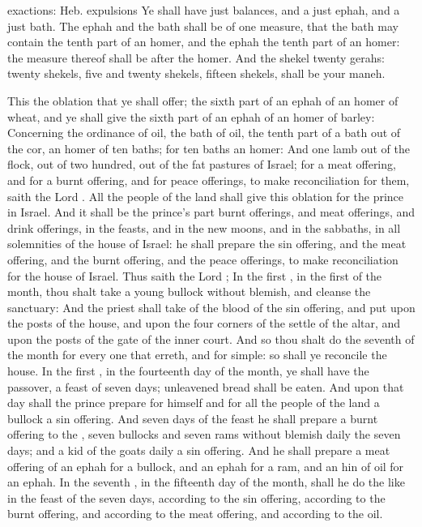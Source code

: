 {{exactions: Heb. expulsions}
Ye shall have
just
balances, and a
just
ephah, and a
just
bath.
The
ephah and the
bath shall be of
one
measure, that the
bath may
contain the tenth
part of an
homer, and the
ephah the tenth
part of an
homer: the
measure thereof shall be after the
homer.
And the
shekel
{}
twenty
gerahs:
twenty
shekels,
five and
twenty
shekels,
fifteen
shekels, shall be your
maneh.
\par }{\PP {}This
{} the
oblation that ye shall
offer; the sixth
part of an
ephah of an
homer of
wheat, and ye shall give the sixth
part of an
ephah of an
homer of
barley:
Concerning the
ordinance of
oil, the
bath of
oil,
{} the tenth
part of a
bath out of the
cor,
{} an
homer of
ten
baths; for
ten
baths
{} an
homer:
And
one
lamb out of the
flock, out of two
hundred, out of the fat
pastures of
Israel; for a meat
offering, and for a burnt
offering, and for peace
offerings, to make
reconciliation for them,
saith the
Lord
{}.
All the
people of the
land shall give this
oblation for the
prince in
Israel.
And it shall be the
prince’s part
{} burnt
offerings, and meat
offerings, and drink
offerings, in the
feasts, and in the new
moons, and in the
sabbaths, in all
solemnities of the
house of
Israel: he shall
prepare the sin
offering, and the meat
offering, and the burnt
offering, and the peace
offerings, to make
reconciliation for the
house of
Israel.
Thus
saith the
Lord
{}; In the
first
{}, in the
first
{} of the
month, thou shalt
take a
young
bullock without
blemish, and
cleanse the
sanctuary:
And the
priest shall
take of the
blood of the sin
offering, and
put
{} upon the
posts of the
house, and upon the
four
corners of the
settle of the
altar, and upon the
posts of the
gate of the
inner
court.
And so thou shalt
do the
seventh
{} of the
month for every
one that
erreth, and for
{}
simple: so shall ye
reconcile the
house.
In the
first
{}, in the
fourteenth
day of the
month, ye shall have the
passover, a
feast of
seven
days; unleavened
bread shall be
eaten.
And upon that
day shall the
prince
prepare for himself and for all the
people of the
land a
bullock
{} a sin
offering.
And
seven
days of the
feast he shall
prepare a burnt
offering to the
{},
seven
bullocks and
seven
rams without
blemish
daily the
seven
days; and a
kid of the
goats
daily
{} a sin
offering.
And he shall
prepare a meat
offering of an
ephah for a
bullock, and an
ephah for a
ram, and an
hin of
oil for an
ephah.
In the
seventh
{}, in the
fifteenth
day of the
month, shall he
do the like in the
feast of the
seven
days, according to the sin
offering, according to the burnt
offering, and according to the meat
offering, and according to the
oil.

}
